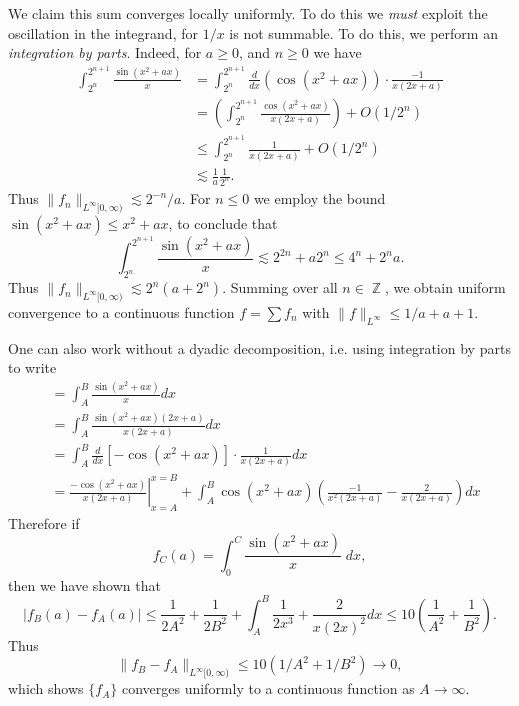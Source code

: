 \documentclass[answers]{exam}
\DeclareMathOperator{\ZZ}{\mathbb{Z}}
\begin{document}
\begin{questions}
\begin{solution}
	We claim this sum converges locally uniformly. To do this we \emph{must} exploit the oscillation in the integrand, for $1/x$ is not summable. To do this, we perform an \emph{integration by parts}. Indeed, for $a \geq 0$, and $n \geq 0$ we have
	\begin{align*}
		\int_{2^n}^{2^{n+1}} \frac{\sin(x^2 + ax)}{x} &= \int_{2^n}^{2^{n+1}} \frac{d}{dx} \left( \cos(x^2 + ax) \right) \cdot \frac{-1}{x(2x + a)}\\
		&= \left( \int_{2^n}^{2^{n+1}} \frac{\cos(x^2 + ax)}{x(2x + a)} \right) + O(1/2^n)\\
		&\leq \int_{2^n}^{2^{n+1}} \frac{1}{x(2x + a)} + O(1/2^n)\\
		&\lesssim \frac{1}{a} \frac{1}{2^n}.
	\end{align*}
	Thus $\| f_n \|_{L^\infty[0,\infty)} \lesssim 2^{-n}/a$. For $n \leq 0$ we employ the bound $\sin(x^2 + ax) \leq x^2 + ax$, to conclude that
	\[ \int_{2^n}^{2^{n+1}} \frac{\sin(x^2 + ax)}{x} \lesssim 2^{2n} + a 2^n \leq 4^n + 2^n a. \]
	Thus $\| f_n \|_{L^\infty[0,\infty)} \lesssim 2^n (a + 2^n)$. Summing over all $n \in \ZZ$, we obtain uniform convergence to a continuous function $f = \sum f_n$ with $\| f \|_{L^\infty} \leq 1/a + a + 1$.

	One can also work without a dyadic decomposition, i.e. using integration by parts to write
  \begin{align*}
      &= \int_{A}^{B}\frac{\sin(x^{2}+ax)}{x}dx\\ 
      &= \int_{A}^{B}\frac{\sin(x^{2}+ax)(2x+a)}{x(2x+a)}dx\\
      &= \int_{A}^{B} \frac{d}{dx}\left[ -\cos(x^{2}+ax) \right] \cdot \frac{1}{x(2x+a)}dx\\
      &= \left.\frac{-\cos(x^{2}+ax)}{x(2x+a)}\right|^{x=B}_{x=A} + \int_{A}^{B}\cos(x^{2}+ax)\left( \frac{-1}{x^{2}(2x+a)}-\frac{2}{x(2x+a)} \right)  dx
    \end{align*}
    Therefore if
    \[ f_C(a) = \int_0^C \frac{\sin(x^2 + ax)}{x}\; dx, \]
    then we have shown that
    \begin{equation*}
      \left|   f_{B}(a)-f_{A}(a) \right|
      \leq \frac{1}{2A^{2}}+ \frac{1}{2B^{2}} + \int_{A}^{B}\frac{1}{2x^{3}}+ \frac{2}{x(2x)^{2}} dx
      \leq 10 \left( \frac{1}{A^{2}}+\frac{1}{B^{2}}  \right).
    \end{equation*}
    Thus
    \[ \| f_B - f_A \|_{L^\infty[0,\infty)} \leq 10 (1/A^2 + 1/B^2) \to 0, \]
    which shows $\{ f_A \}$ converges uniformly to a continuous function as $A \to \infty$.
\end{solution}


\end{questions}
\end{document}
